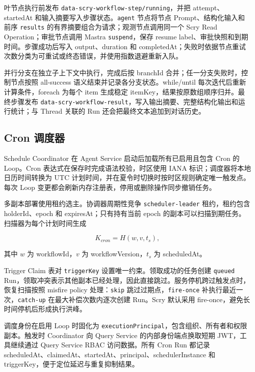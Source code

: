 \documentclass[conference,10pt]{IEEEtran}
\newcommand{\code}[1]{\texttt{#1}}
\begin{document}
叶节点执行前发布 \code{data-scry-workflow-step/running}，并把 attempt、startedAt 和输入摘要写入步骤状态。\code{agent} 节点将节点 Prompt、结构化输入和前序 \code{results} 的有界摘要组合为请求；观测节点调用同一个 Scry Read Operation；审批节点调用 Mastra \code{suspend}，保存 resume label、审批快照和到期时间。步骤成功后写入 output、duration 和 completedAt；失败时依据节点重试次数分类为可重试或终态错误，并使用指数退避重新入队。

并行分支在独立子上下文中执行，完成后按 branchId 合并；任一分支失败时，控制节点按照 all-success 语义结束并记录各分支状态。while/until 每次迭代后重新计算条件，foreach 为每个 item 生成稳定 itemKey，结果按原数组顺序归并。最终步骤发布 \code{data-scry-workflow-result}，写入输出摘要、完整结构化输出和运行统计；与 Thread 关联的 Run 还会把最终文本追加到对话历史。

\subsection{Cron 调度器}

Schedule Coordinator 在 Agent Service 启动后加载所有已启用且包含 Cron 的 Loop。Cron 表达式在保存时完成语法校验，时区使用 IANA 标识；调度器将本地日历时间转换为 UTC 计划时间，并在夏令时切换时按时区规则确定唯一触发点。每次 Loop 变更都会刷新内存注册表，停用或删除操作同步撤销任务。

多副本部署使用租约选主。协调器周期性竞争 \code{scheduler-leader} 租约，租约包含 holderId、epoch 和 expiresAt；只有持有当前 epoch 的副本可以扫描到期任务。扫描器为每个计划时间生成

\begin{equation}
 K_{cron}=H(w,v,t_s),
\end{equation}

其中 $w$ 为 workflowId，$v$ 为 workflowVersion，$t_s$ 为 scheduledAt。

Trigger Claim 表对 \code{triggerKey} 设置唯一约束。领取成功的任务创建 \code{queued} Run，领取冲突表示其他副本已经处理，因此直接跳过。服务停机跨过触发点时，恢复扫描按照 misfire policy 处理：\code{skip} 跳过过期点，\code{fire-once} 补执行最近一次，\code{catch-up} 在最大补偿次数内逐次创建 Run。Scry 默认采用 fire-once，避免长时间停机后形成执行洪峰。

调度身份在启用 Loop 时固化为 \code{executionPrincipal}，包含组织、所有者和权限副本。触发时 Coordinator 向 Query Service 的内部身份端点换取短期 JWT，工具继续通过 Query Service RBAC 访问数据。所有 Cron Run 都记录 scheduledAt、claimedAt、startedAt、principal、schedulerInstance 和 triggerKey，便于定位延迟与重复抑制结果。
\end{document}
